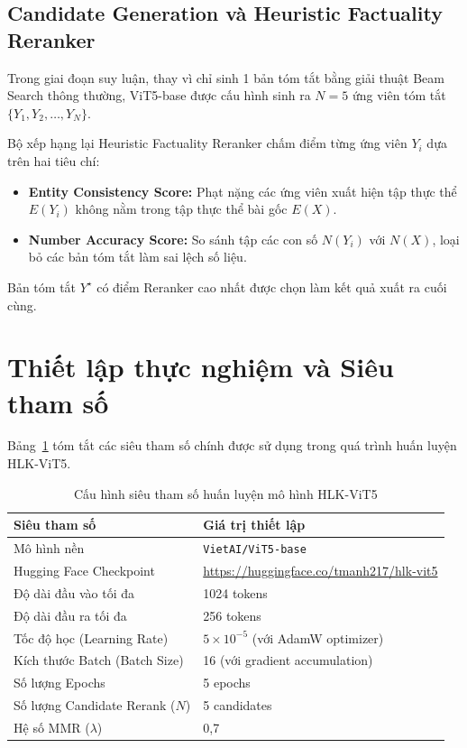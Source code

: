 \subsection{Candidate Generation và Heuristic Factuality Reranker}

Trong giai đoạn suy luận, thay vì chỉ sinh 1 bản tóm tắt bằng giải thuật Beam Search thông thường, ViT5-base được cấu hình sinh ra $N = 5$ ứng viên tóm tắt $\{Y_1, Y_2, \ldots, Y_N\}$.

Bộ xếp hạng lại Heuristic Factuality Reranker chấm điểm từng ứng viên $Y_i$ dựa trên hai tiêu chí:

\begin{itemize}
  \item \textbf{Entity Consistency Score:} Phạt nặng các ứng viên xuất hiện tập thực thể $E(Y_i)$ không nằm trong tập thực thể bài gốc $E(X)$.
  \item \textbf{Number Accuracy Score:} So sánh tập các con số $N(Y_i)$ với $N(X)$, loại bỏ các bản tóm tắt làm sai lệch số liệu.
\end{itemize}

Bản tóm tắt $Y^{\star}$ có điểm Reranker cao nhất được chọn làm kết quả xuất ra cuối cùng.

\section{Thiết lập thực nghiệm và Siêu tham số}

Bảng~\ref{tab:training_hyperparams} tóm tắt các siêu tham số chính được sử dụng trong quá trình huấn luyện HLK-ViT5.

\begin{table}[htbp]
\centering
\caption{Cấu hình siêu tham số huấn luyện mô hình HLK-ViT5}
\label{tab:training_hyperparams}
\begin{tabularx}{\textwidth}{l X}
\hline
\textbf{Siêu tham số} & \textbf{Giá trị thiết lập} \\ \hline
Mô hình nền & \texttt{VietAI/ViT5-base} \\
Hugging Face Checkpoint & \url{https://huggingface.co/tmanh217/hlk-vit5} \\
Độ dài đầu vào tối đa & 1024 tokens \\
Độ dài đầu ra tối đa & 256 tokens \\
Tốc độ học (Learning Rate) & $5 \times 10^{-5}$ (với AdamW optimizer) \\
Kích thước Batch (Batch Size) & 16 (với gradient accumulation) \\
Số lượng Epochs & 5 epochs \\
Số lượng Candidate Rerank ($N$) & 5 candidates \\
Hệ số MMR ($\lambda$) & 0,7 \\ \hline
\end{tabularx}
\end{table}

